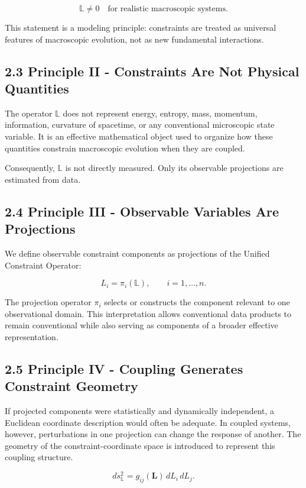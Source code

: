 \documentclass[aps,pre,reprint,superscriptaddress,nofootinbib]{revtex4-2}
\begin{document}
\[ \mathbb{L} \neq 0 \quad \text{for realistic macroscopic systems.} \]

This statement is a modeling principle: constraints are treated as universal features of macroscopic evolution, not as new fundamental interactions.

\subsection{2.3 Principle II - Constraints Are Not Physical Quantities}

The operator \(\mathbb{L}\) does not represent energy, entropy, mass, momentum, information, curvature of spacetime, or any conventional microscopic state variable. It is an effective mathematical object used to organize how these quantities constrain macroscopic evolution when they are coupled.

Consequently, \(\mathbb{L}\) is not directly measured. Only its observable projections are estimated from data.

\subsection{2.4 Principle III - Observable Variables Are Projections}

We define observable constraint components as projections of the Unified Constraint Operator:

\[ L_i = \pi_i(\mathbb{L}), \qquad i=1,\ldots,n. \]

The projection operator \(\pi_i\) selects or constructs the component relevant to one observational domain. This interpretation allows conventional data products to remain conventional while also serving as components of a broader effective representation.

\subsection{2.5 Principle IV - Coupling Generates Constraint Geometry}

If projected components were statistically and dynamically independent, a Euclidean coordinate description would often be adequate. In coupled systems, however, perturbations in one projection can change the response of another. The geometry of the constraint-coordinate space is introduced to represent this coupling structure.

\[ ds_{\mathbb{L}}^2 = g_{ij}(\mathbf{L})\,dL_i\,dL_j. \]
\end{document}

